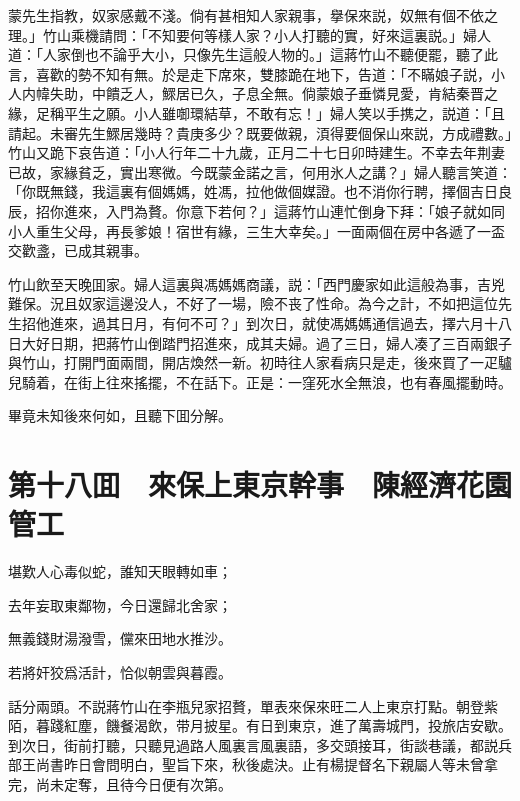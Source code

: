 蒙先生指教，奴家感戴不淺。倘有甚相知人家親事，擧保來説，奴無有個不依之理。」竹山乘機請問：「不知要何等樣人家？小人打聽的實，好來這裏説。」婦人道：「人家倒也不論乎大小，只像先生這般人物的。」這蔣竹山不聽便罷，聽了此言，喜歡的勢不知有無。於是走下席來，雙膝跪在地下，告道：「不瞞娘子説，小人内幃失助，中饋乏人，鰥居已久，子息全無。倘蒙娘子垂憐見愛，肯結秦晋之緣，足稱平生之願。小人雖啣環結草，不敢有忘！」婦人笑以手携之，説道：「且請起。未審先生鰥居幾時？貴庚多少？既要做親，湏得要個保山來説，方成禮數。」竹山又跪下哀告道：「小人行年二十九歲，正月二十七日卯時建生。不幸去年荆妻已故，家緣貧乏，實出寒微。今既蒙金諾之言，何用氷人之講？」婦人聽言笑道：「你既無錢，我這裏有個媽媽，姓馮，拉他做個媒證。也不消你行聘，擇個吉日良辰，招你進來，入門為贅。你意下若何？」這蔣竹山連忙倒身下拜：「娘子就如同小人重生父母，再長爹娘！宿世有緣，三生大幸矣。」一面兩個在房中各遞了一盃交歡盞，已成其親事。

竹山飲至天晚囬家。婦人這裏與馮媽媽商議，説：「西門慶家如此這般為事，吉兇難保。況且奴家這邊没人，不好了一場，險不丧了性命。為今之計，不如把這位先生招他進來，過其日月，有何不可？」到次日，就使馮媽媽通信過去，擇六月十八日大好日期，把蔣竹山倒踏門招進來，成其夫婦。過了三日，婦人凑了三百兩銀子與竹山，打開門面兩間，開店煥然一新。初時往人家看病只是走，後來買了一疋驢兒騎着，在街上往來搖擺，不在話下。正是：一窪死水全無浪，也有春風擺動時。

畢竟未知後來何如，且聽下囬分解。

\chapter*{第十八囬　來保上東京幹事　陳經濟花園管工}

堪歎人心毒似蛇，誰知天眼轉如車；

去年妄取東鄰物，今日還歸北舍家；

無義錢財湯潑雪，儻來田地水推沙。

若將奸狡爲活計，恰似朝雲與暮霞。

話分兩頭。不説蔣竹山在李瓶兒家招贅，單表來保來旺二人上東京打點。朝登紫陌，暮踐紅塵，饑餐渴飲，带月披星。有日到東京，進了萬壽城門，投旅店安歇。到次日，街前打聽，只聽見過路人風裏言風裏語，多交頭接耳，街談巷議，都説兵部王尚書昨日會問明白，聖旨下來，秋後處決。止有楊提督名下親屬人等未曾拿完，尚未定奪，且待今日便有次第。

